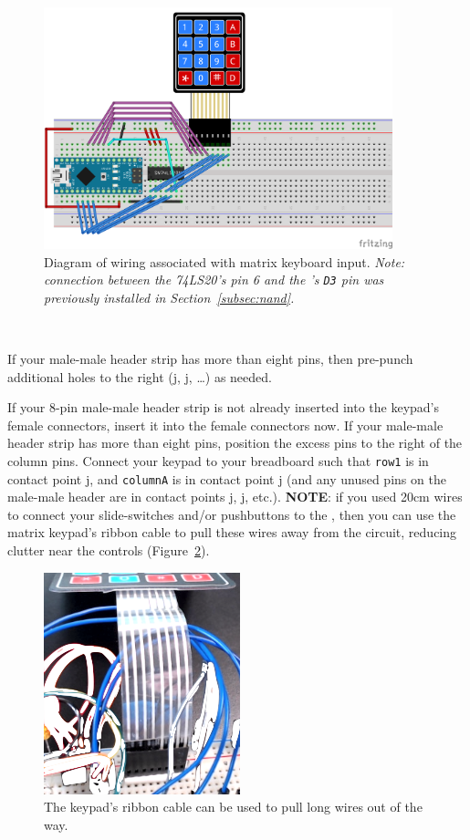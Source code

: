 \begin{figure}%
    \centering
    \includegraphics[width=0.9\textwidth]{fritzing_diagrams/keypad}
    \caption{Diagram of wiring associated with matrix keyboard input.
        \textit{Note: connection between the 74LS20's pin 6 and the \developmentboard's
        \texttt{D3} pin was previously installed in Section~\ref{subsec:nand}.}
        \label{fig:keypad-diagram}}
\end{figure}

\disconnect\

If your male-male header strip has more than eight pins, then pre-punch additional holes to the right (j, j, \dots) as needed.

If your 8-pin male-male header strip is not already inserted into the keypad's female connectors, insert it into the female connectors now.
If your male-male header strip has more than eight pins, position the excess pins to the right of the column pins.
Connect your keypad to your breadboard such that \texttt{row1} is in contact point j, and \texttt{columnA} is in contact point j (and any unused pins on the male-male header are in contact points j, j, etc.).
\textbf{NOTE}: if you used 20cm wires to connect your slide-switches and/or pushbuttons to the \developmentboard, then you can use the matrix keypad's ribbon cable to pull these wires away from the circuit, reducing clutter near the controls (Figure~\ref{fig:keypad-pullingwires}).

\begin{figure}
    \centering
    \includegraphics{keypad/keypad-pullingwires}
    \caption{The keypad's ribbon cable can be used to pull long wires out of the way. \label{fig:keypad-pullingwires}}
\end{figure}

